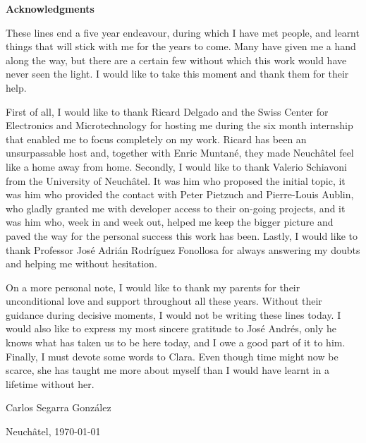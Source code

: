 \vspace*{2cm}
\Huge
\textbf{Acknowledgments} \label{sec:acknowledgments}
\normalsize

\vspace{1cm}

These lines end a five year endeavour, during which I have met people, and learnt things that will stick with me for the years to come.
Many have given me a hand along the way, but there are a certain few without which this work would have never seen the light.
I would like to take this moment and thank them for their help.

First of all, I would like to thank Ricard Delgado and the Swiss Center for Electronics and Microtechnology for hosting me during the six month internship that enabled me to focus completely on my work.
Ricard has been an unsurpassable host and, together with Enric Muntan\'e, they made Neuch\^atel feel like a home away from home.
Secondly, I would like to thank Valerio Schiavoni from the University of Neuch\^atel.
It was him who proposed the initial topic, it was him who provided the contact with Peter Pietzuch and Pierre-Louis Aublin, who gladly granted me with developer access to their on-going projects, and it was him who, week in and week out, helped me keep the bigger picture and paved the way for the personal success this work has been.
Lastly, I would like to thank Professor Jos\'e Adri\'an Rodr\'iguez Fonollosa for always answering my doubts and helping me without hesitation.

On a more personal note, I would like to thank my parents for their unconditional love and support throughout all these years.
Without their guidance during decisive moments, I would not be writing these lines today.
I would also like to express my most sincere gratitude to Jos\'e Andr\'es, only he knows what has taken us to be here today, and I owe a good part of it to him.
Finally, I must devote some words to Clara.
Even though time might now be scarce, she has taught me more about myself than I would have learnt in a lifetime without her.

\vspace{1cm}

\begin{flushright}
Carlos Segarra Gonz\'alez

Neuch\^atel, \today
\end{flushright}

\vspace*{\fill}
